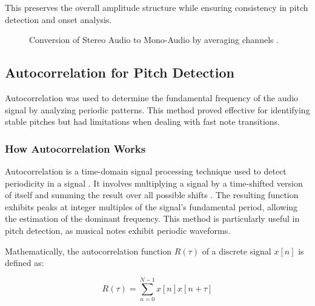 \documentclass{article}
\begin{document}
This preserves the overall amplitude structure while ensuring consistency in pitch detection and onset analysis.

\begin{figure}[H]
\caption{Conversion of Stereo Audio to Mono-Audio by averaging channels \cite{iZotope}.}
\end{figure}

\newpage

\subsection{Autocorrelation for Pitch Detection}
Autocorrelation was used to determine the fundamental frequency of the audio signal by analyzing periodic patterns. This method proved effective for identifying stable pitches but had limitations when dealing with fast note transitions.

\subsubsection{How Autocorrelation Works}
Autocorrelation is a time-domain signal processing technique used to detect periodicity in a signal \cite{Rabiner-use}. It involves multiplying a signal by a time-shifted version of itself and summing the result over all possible shifts \cite{Rabiner-use, Rabiner-digital}. The resulting function exhibits peaks at integer multiples of the signal's fundamental period, allowing the estimation of the dominant frequency. This method is particularly useful in pitch detection, as musical notes exhibit periodic waveforms.

Mathematically, the autocorrelation function $R(\tau)$ of a discrete signal $x[n]$ is defined as:

\begin{equation}
R(\tau) = \sum_{n=0}^{N-1} x[n] x[n+\tau]
\end{equation}
\end{document}
